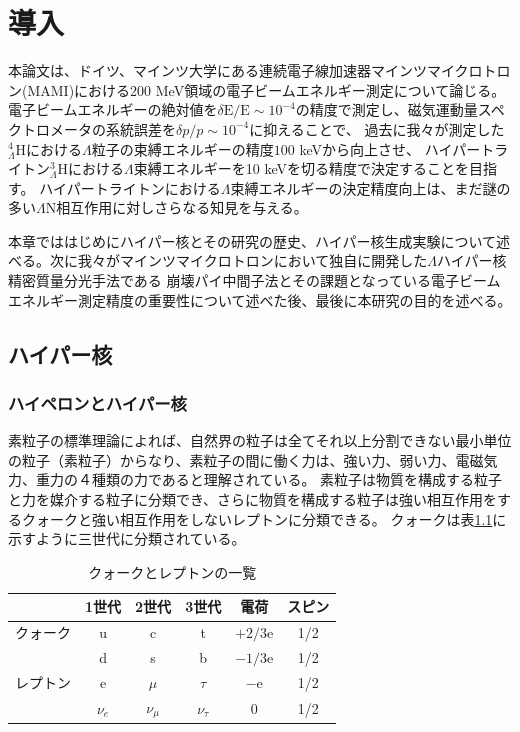 \documentclass[a4paper,11pt,uplatex]{jsbook}
\begin{document}
\chapter{導入}
本論文は、ドイツ、マインツ大学にある連続電子線加速器マインツマイクロトロン(MAMI)における200 MeV領域の電子ビームエネルギー測定について論じる。
電子ビームエネルギーの絶対値を$\delta \text{E}/\text{E} \sim 10^{-4}$の精度で測定し、磁気運動量スペクトロメータの系統誤差を$\delta p/p \sim 10^{-4}$に抑えることで、
過去に我々が測定した$^4_{\Lambda} \text{H}$における$\Lambda$粒子の束縛エネルギーの精度$100$ keVから向上させ、
ハイパートライトン$^3_{\Lambda}\text{H}$における$\Lambda$束縛エネルギーを10 keVを切る精度で決定することを目指す。
ハイパートライトンにおける$\Lambda$束縛エネルギーの決定精度向上は、まだ謎の多い$\Lambda$N相互作用に対しさらなる知見を与える。

本章でははじめにハイパー核とその研究の歴史、ハイパー核生成実験について述べる。次に我々がマインツマイクロトロンにおいて独自に開発した$\Lambda$ハイパー核精密質量分光手法である
崩壊パイ中間子法とその課題となっている電子ビームエネルギー測定精度の重要性について述べた後、最後に本研究の目的を述べる。
\section{ハイパー核}

\subsection{ハイペロンとハイパー核}
素粒子の標準理論によれば、自然界の粒子は全てそれ以上分割できない最小単位の粒子（素粒子）からなり、素粒子の間に働く力は、強い力、弱い力、電磁気力、重力の４種類の力であると理解されている。
素粒子は物質を構成する粒子と力を媒介する粒子に分類でき、さらに物質を構成する粒子は強い相互作用をするクォークと強い相互作用をしないレプトンに分類できる。
クォークは表\ref{tab:quark}に示すように三世代に分類されている。
\begin{table}[ht]
\centering
\begin{tabular}{|c||c|c|c||c|c|}
  \hline
  & 1世代 & 2世代 & 3世代 & 電荷 & スピン\\
  \hline\hline
  クォーク & u & c & t & $+2/3$e & 1/2\\
  & d & s & b & $-1/3$e & 1/2\\ \hline
  レプトン & e& $\mu$& $\tau$& $-$e& 1/2\\
  &$\nu_e$ & $\nu_\mu$& $\nu_\tau$& 0 & 1/2\\
  \hline
\end{tabular}
\caption{クォークとレプトンの一覧}\label{tab:quark}
\end{table}
\end{document}
